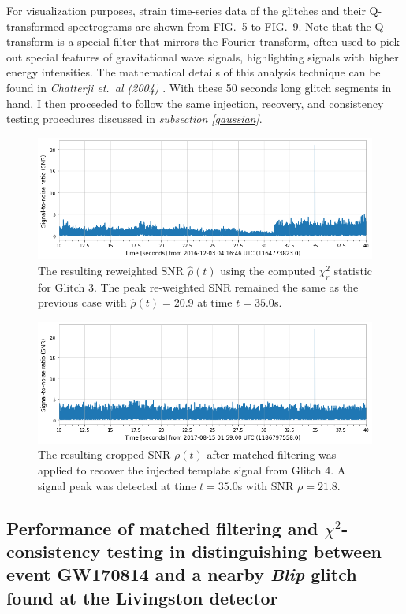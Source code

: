 \documentclass[preprint,
letterpaper,
 amsmath,amssymb,
 aps,
]{revtex4-2}
\begin{document}
For visualization purposes, strain time-series data of the glitches and their Q-transformed spectrograms are shown from FIG.\ 5 to FIG.\ 9. Note that the Q-transform is a special filter that mirrors the Fourier transform, often used to pick out special features of gravitational wave signals, highlighting signals with higher energy intensities. The mathematical details of this analysis technique can be found in \textit{Chatterji et.\ al (2004)} \cite{qtransform}.  With these 50 seconds long glitch segments in hand, I then proceeded to follow the same injection, recovery, and consistency testing procedures discussed in \textit{subsection \ref{gaussian}}. 

\begin{figure}[t]
\includegraphics[width = .9\textwidth]{reweighted glitch 3.png}
\caption{The resulting reweighted SNR $\hat{\rho}(t)$ using the computed $\chi^2_r$ statistic for Glitch 3. The peak re-weighted SNR remained the same as the previous case with $\hat{\rho}(t)=20.9$ at time $t=35.0$s.}
\centering
\end{figure}

\begin{figure}[t] \label{snr 4}
\includegraphics[width = .9\textwidth]{glitch 4 template 1.png}
\caption{The resulting cropped SNR $\rho(t)$ after matched filtering was applied to recover the injected template signal from Glitch 4. A signal peak was detected at time $t = 35.0$s with SNR $\rho = 21.8$.}
\centering
\end{figure}

\subsection{Performance of matched filtering and $\chi^2$-consistency testing in distinguishing between event GW170814 and a nearby \textit{Blip} glitch found at the Livingston detector}
\end{document}
